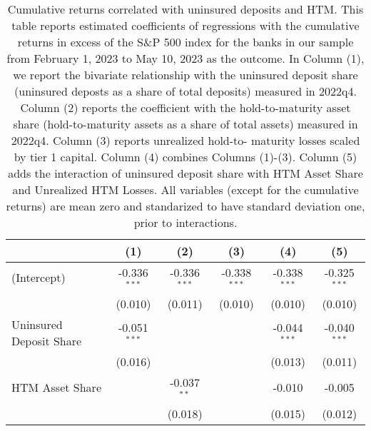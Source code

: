 
\begin{table}[htbp]
   \caption{\label{tab:dep_htm_late} Cumulative returns correlated with uninsured deposits and HTM. This table reports estimated coefficients of regressions with the cumulative returns in excess of the S\&P 500 index for the banks in our sample from February 1, 2023 to May 10, 2023 as the outcome.  In Column (1), we report the bivariate relationship with the uninsured deposit share (uninsured deposts as a share of total
   deposits) measured in 2022q4. Column (2) reports the coefficient with the hold-to-maturity asset share (hold-to-maturity assets
   as a share of total assets) measured in 2022q4. Column (3) reports unrealized hold-to-
   maturity losses scaled by tier 1 capital. Column (4) combines Columns (1)-(3). Column (5) adds the interaction of uninsured deposit share with HTM Asset Share and Unrealized HTM Losses. All variables (except for the cumulative returns) are mean zero and standarized to have standard deviation one, prior to interactions.}
   \bigskip
   \centering
   \begin{adjustbox}{width = 1.2\textwidth, center}
      \begin{tabular}{lccccc}
         \toprule
                                                                                  & (1)            & (2)            & (3)            & (4)            & (5)\\  
         \midrule 
         (Intercept)                                                              & -0.336$^{***}$ & -0.336$^{***}$ & -0.338$^{***}$ & -0.338$^{***}$ & -0.325$^{***}$\\   
                                                                                  & (0.010)        & (0.011)        & (0.010)        & (0.010)        & (0.010)\\   
         Uninsured Deposit Share                                                  & -0.051$^{***}$ &                &                & -0.044$^{***}$ & -0.040$^{***}$\\   
                                                                                  & (0.016)        &                &                & (0.013)        & (0.011)\\   
         HTM Asset Share                                                          &                & -0.037$^{**}$  &                & -0.010         & -0.005\\   
                                                                                  &                & (0.018)        &                & (0.015)        & (0.012)\\   

\end{tabular}
\end{adjustbox}
\end{table}
